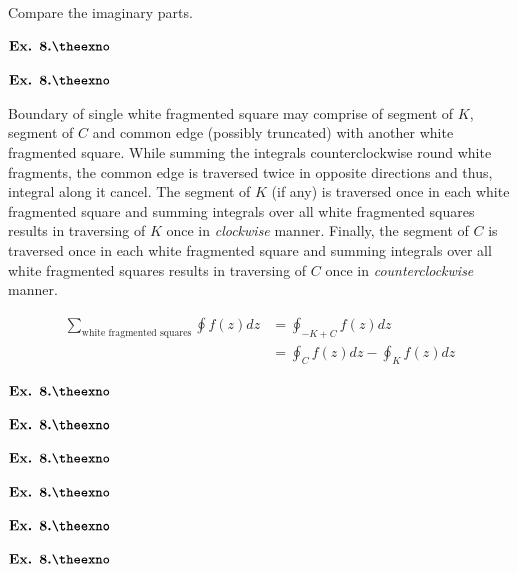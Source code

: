 \documentclass{article}
\def\tt{\textit}
\newcounter{exno}
\begin{document}
Compare the imaginary parts.

\vspace{0.2in}

${\textbf{Ex. 8.\theexno}}$\addtocounter{exno}{1}



\vspace{0.2in}

${\textbf{Ex. 8.\theexno}}$\addtocounter{exno}{1}
Boundary of single white fragmented square may comprise of segment of $K$, segment of $C$ and common edge (possibly truncated) with another white fragmented square. While summing the integrals counterclockwise round white fragments, the common edge is traversed twice in opposite directions and thus, integral along it cancel. The segment of $K$ (if any) is traversed once in each white fragmented square and summing integrals over all white fragmented squares results in traversing of $K$ once in \tt{clockwise} manner. Finally, the segment of $C$ is traversed once in each white fragmented square and summing integrals over all white fragmented squares results in traversing of $C$ once in \tt{counterclockwise} manner.

\begin{align*}
    \sum_{\text{white fragmented squares}}\oint f(z)dz &=  \oint_{-K+C}f(z)dz\\
    &=\oint_{C}f(z)dz - \oint_{K}f(z)dz
\end{align*}

\vspace{0.2in}

${\textbf{Ex. 8.\theexno}}$\addtocounter{exno}{1}

\vspace{0.2in}

${\textbf{Ex. 8.\theexno}}$\addtocounter{exno}{1}

\vspace{0.2in}

${\textbf{Ex. 8.\theexno}}$\addtocounter{exno}{1}

\vspace{0.2in}

${\textbf{Ex. 8.\theexno}}$\addtocounter{exno}{1}

\vspace{0.2in}

${\textbf{Ex. 8.\theexno}}$\addtocounter{exno}{1}

\vspace{0.2in}

${\textbf{Ex. 8.\theexno}}$\addtocounter{exno}{1}

\vspace{0.2in}
\end{document}
